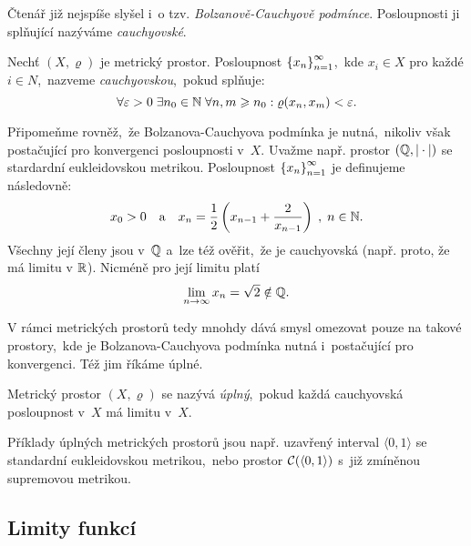Čtenář již nejspíše slyšel i~o tzv. \emph{Bolzanově-Cauchyově podmínce}. Posloupnosti ji splňující nazýváme \emph{cauchyovské}.
\begin{definition}\label{def:cauchyovska-posloupnost}
    Nechť $(X,\varrho)$ je metrický prostor. Posloupnost $\left\{x_n\right\}_{n=1}^\infty$,~kde $x_i\in X$ pro každé $i\in N$,~nazveme \emph{cauchyovskou},~pokud splňuje:
    \[\forall\varepsilon>0\;\exists n_0\in\mathbb{N}\;\forall n,m\geqslant n_0:\varrho(x_n,x_m)<\varepsilon.\]
\end{definition}
Připomeňme rovněž,~že Bolzanova-Cauchyova podmínka je nutná,~nikoliv však postačující pro konvergenci posloupnosti v~$X$. Uvažme např. prostor $(\mathbb{Q},|\cdot|)$ se stardardní eukleidovskou metrikou. Posloupnost $\left\{x_n\right\}_{n=1}^\infty$ je definujeme následovně:
\[x_0>0\quad\text{a}\quad x_n=\dfrac{1}{2}\left(x_{n-1}+\dfrac{2}{x_{n-1}}\right)\;,\;n\in\mathbb{N}.\]
Všechny její členy jsou v~$\mathbb{Q}$ a~lze též ověřit,~že je cauchyovská (např. proto, že má limitu v $\mathbb{R}$). Nicméně pro její limitu platí
\[\lim_{n\to\infty}x_n=\sqrt{2}\notin\mathbb{Q}.\]

V rámci metrických prostorů tedy mnohdy dává smysl omezovat pouze na takové prostory,~kde je Bolzanova-Cauchyova podmínka nutná i~postačující pro konvergenci. Též jim říkáme úplné.
\begin{definition}\label{def:uplny-mp}
    Metrický prostor $(X,\varrho)$ se nazývá \emph{úplný},~pokud každá cauchyovská posloupnost v~$X$ má limitu v~$X$.
\end{definition}
Příklady úplných metrických prostorů jsou např. uzavřený interval $\langle0,1\rangle$ se standardní eukleidovskou metrikou,~nebo prostor $\mathcal{C}(\langle0,1\rangle)$ s~již zmíněnou supremovou metrikou.

\subsection{Limity funkcí}\label{subsec:limity-fci}


